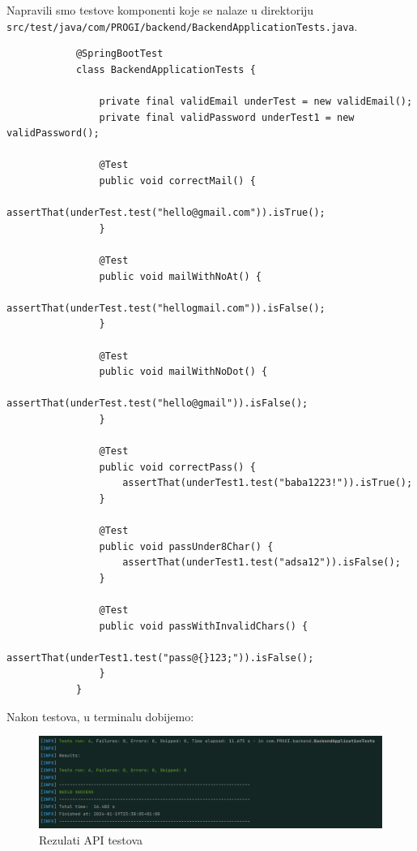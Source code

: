 			
			
			
			 
			 \noindent Napravili smo testove komponenti koje se nalaze u direktoriju \texttt{src/test/java/com/PROGI/backend/BackendApplicationTests.java}.

			\noindent{}

			\begin{verbatim}
			@SpringBootTest
			class BackendApplicationTests {

				private final validEmail underTest = new validEmail();
				private final validPassword underTest1 = new validPassword();

				@Test
				public void correctMail() {
					assertThat(underTest.test("hello@gmail.com")).isTrue();
				}

				@Test
				public void mailWithNoAt() {
					assertThat(underTest.test("hellogmail.com")).isFalse();
				}

				@Test
				public void mailWithNoDot() {
					assertThat(underTest.test("hello@gmail")).isFalse();
				}

				@Test
				public void correctPass() {
					assertThat(underTest1.test("baba1223!")).isTrue();
				}

				@Test
				public void passUnder8Char() {
					assertThat(underTest1.test("adsa12")).isFalse();
				}

				@Test
				public void passWithInvalidChars() {
					assertThat(underTest1.test("pass@{}123;")).isFalse();
				}
			}
			\end{verbatim}

			\noindent Nakon testova, u terminalu dobijemo:
			\begin{figure}[H]
				\centering
				\includegraphics[width=1\textwidth]{slike/testResults.png}
				\caption{Rezulati API testova}
				\label{fig:enter-label}
			\end{figure}

